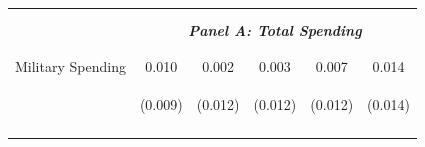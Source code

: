 \documentclass[dv_diss_main.tex]{subfiles}
\begin{document}
\begin{table}[H]
\begin{center}
\begin{tabular}{lccccc}
    \vspace{-1.5pt} & \vspace{-1.5pt} & \vspace{-1.5pt} & \vspace{-1.5pt} & \vspace{-1.5pt} \\
    \cmidrule{2-6}
    \vspace{-1.5pt} & \vspace{-1.5pt} & \vspace{-1.5pt} & \vspace{-1.5pt} & \vspace{-1.5pt} \\
    & \multicolumn{5}{c}{\textit{\textbf{Panel A: Total Spending}}} \\ 
    \vspace{-1.5pt} & \vspace{-1.5pt} & \vspace{-1.5pt} & \vspace{-1.5pt} & \vspace{-1.5pt} \\ 
    \cmidrule{2-6}
    \vspace{-1.5pt} & \vspace{-1.5pt} & \vspace{-1.5pt} & \vspace{-1.5pt} & \vspace{-1.5pt}\\
    Military Spending & 0.010 & 0.002 & 0.003 & 0.007 & 0.014 \\
    & \begin{footnotesize}(0.009)\end{footnotesize} & \begin{footnotesize}(0.012)\end{footnotesize} & \begin{footnotesize}(0.012)\end{footnotesize} & \begin{footnotesize}(0.012)\end{footnotesize} & \begin{footnotesize}(0.014)\end{footnotesize} \\
    \vspace{-1.5pt} & \vspace{-1.5pt} & \vspace{-1.5pt} & \vspace{-1.5pt} & \vspace{-1.5pt} \\
    

\end{tabular}
\end{center}
\end{table}
\end{document}
